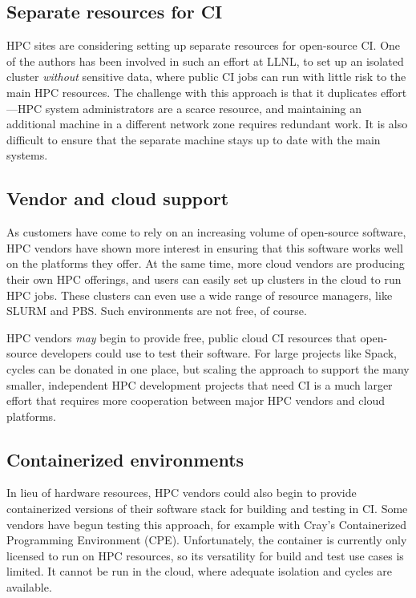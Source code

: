 \documentclass{IEEEcsmag}
\begin{document}
\subsection{Separate resources for CI}

HPC sites are considering setting up separate resources for open-source CI. One of the
authors has been involved in such an effort at LLNL, to set up an isolated cluster {\it
  without} sensitive data, where public CI jobs can run with little risk to the main
HPC resources. The challenge with this approach is that it
duplicates effort---HPC system administrators are a scarce resource, and
maintaining an additional machine in a different network zone requires redundant work.
It is also difficult to ensure that the separate machine stays up to date with the main
systems.

\subsection{Vendor and cloud support}

As customers have come to rely on an increasing volume of open-source software, HPC vendors have
shown more interest in ensuring that this software works well on the platforms
they offer.  At the same time, more cloud vendors are producing their own HPC
offerings, and users can easily set up clusters in the cloud to run
HPC jobs. These clusters can even use a wide range of resource managers, like SLURM and PBS.
Such environments are not free, of course.

HPC vendors {\it may} begin to provide free, public cloud CI resources that open-source
developers could use to test their software. For large projects like
Spack, cycles can be donated in one place, but scaling the approach to support the many smaller,
independent HPC development projects that need CI is a much larger effort that
requires more cooperation between major HPC vendors and cloud platforms.

\subsection{Containerized environments}

In lieu of hardware resources, HPC vendors could also begin to provide containerized
versions of their software stack for building and testing in CI. Some vendors
have begun testing this approach, for example with Cray's Containerized Programming Environment
(CPE). Unfortunately, the container is currently only licensed to run on HPC resources,
so its versatility for build and test use cases is limited. It cannot be run in the
cloud, where adequate isolation and cycles are available.
\end{document}
